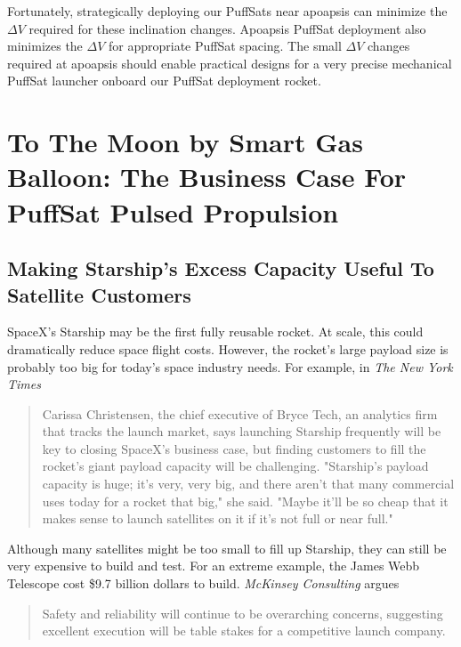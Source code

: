\documentclass{article}
\begin{document}
{Fortunately, strategically deploying our PuffSats near apoapsis can minimize the $\Delta V$ required for these inclination changes. Apoapsis PuffSat deployment also minimizes the $\Delta V$ for appropriate PuffSat spacing. The small $\Delta V$ changes required at apoapsis should enable practical designs for a very precise mechanical PuffSat launcher onboard our PuffSat deployment rocket.

\section{To The Moon by Smart Gas Balloon:  The Business Case For PuffSat Pulsed Propulsion}   

\subsection{Making Starship's Excess Capacity Useful To Satellite Customers} \label{sec:starship_safelaunch}

SpaceX's Starship may be the first fully reusable rocket. At scale, this could dramatically reduce space flight costs.   However, the rocket's large payload size is probably too big for today's space industry needs. For example, in \textit{The New York Times}

\begin{quote}
Carissa Christensen, the chief executive of Bryce Tech, an analytics firm that tracks the launch market, says launching Starship frequently will be key to closing SpaceX’s business case, but finding customers to fill the rocket’s giant payload capacity will be challenging. 
"Starship's payload capacity is huge; it's very, very big, and there aren't that many commercial uses today for a rocket that big," she said.  "Maybe it'll be so cheap that it makes sense to launch satellites on it if it's not full or near full."  \cite{nyt_starship_size}
\end{quote}

Although many satellites might be too small to fill up Starship, they can still be very expensive to build and test. For an extreme example, the James Webb Telescope \cite{james_webb_space_telescope} cost \$9.7 billion dollars \cite{jwst_cost} to build. \textit{McKinsey Consulting} argues 

\begin{quote}
Safety and reliability will continue to be overarching concerns, suggesting excellent execution will be table stakes for a competitive launch company. \cite{mckinsey_reliability}
\end{quote}

}
\end{document}
